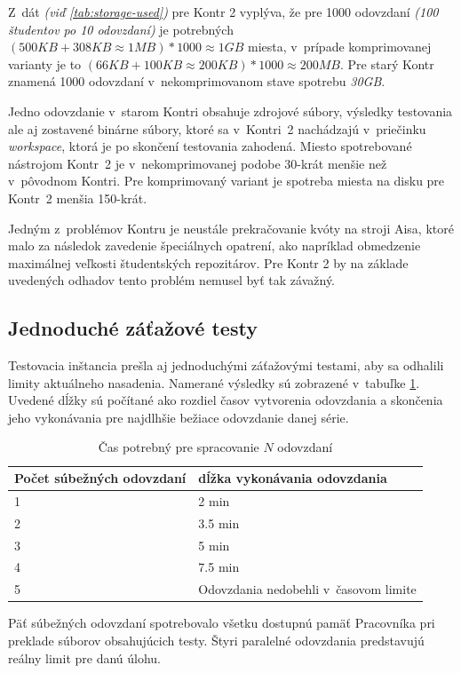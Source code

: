 \documentclass[
  digital, %
  oneside, %
  table,   %
  lof,     %
  lot,   %
]{fithesis3}
\begin{document}
Z~dát \emph{(viď \ref{tab:storage-used})} pre Kontr 2 vyplýva, že pre 1000 odovzdaní \emph{(100 študentov po 10 odovzdaní)} je potrebných $(500 KB + 308KB \approx 1MB) * 1000 \approx 1 GB$ miesta, v~prípade komprimovanej varianty je to $(66KB + 100KB \approx 200KB) * 1000 \approx 200MB$. Pre starý Kontr znamená 1000 odovzdaní v~nekomprimovanom stave spotrebu \emph{30GB}.

Jedno odovzdanie v~starom Kontri obsahuje zdrojové súbory, výsledky testovania ale aj zostavené binárne súbory, ktoré sa v~Kontri~2 nachádzajú v~priečinku \emph{workspace}, ktorá je po skončení testovania zahodená.
Miesto spotrebované nástrojom Kontr~2 je v~nekomprimovanej podobe 30-krát menšie než v~pôvodnom Kontri. Pre komprimovaný variant je spotreba miesta na disku pre Kontr~2 menšia 150-krát.

Jedným z~problémov Kontru je neustále prekračovanie kvóty na stroji Aisa, ktoré malo za následok zavedenie špeciálnych opatrení, ako napríklad obmedzenie maximálnej veľkosti študentských repozitárov. Pre Kontr 2 by na základe uvedených odhadov tento problém nemusel byť tak závažný.

\subsection{Jednoduché záťažové testy}

Testovacia inštancia prešla aj jednoduchými záťažovými testami, aby sa odhalili limity aktuálneho nasadenia. Namerané výsledky sú zobrazené v~tabuľke \ref{tab:timelimits}.
Uvedené dĺžky sú počítané ako rozdiel časov vytvorenia odovzdania a skončenia jeho vykonávania pre najdlhšie bežiace odovzdanie danej série.

\begin{table}[h]
\begin{tabular}{l l}
Počet súbežných odovzdaní & dĺžka vykonávania odovzdania  \\ [0.5ex] 
\hline
1 &  2 min  \\
2 & 3.5 min  \\
3 & 5 min \\
4 & 7.5 min \\  
5 & Odovzdania nedobehli v~časovom limite \\
\end{tabular}
\caption{Čas potrebný pre spracovanie $N$ odovzdaní} \label{tab:timelimits}

\end{table}

Päť súbežných odovzdaní spotrebovalo všetku dostupnú pamäť Pracovníka pri preklade súborov obsahujúcich testy. Štyri paralelné odovzdania predstavujú reálny limit pre danú úlohu. 
\end{document}
